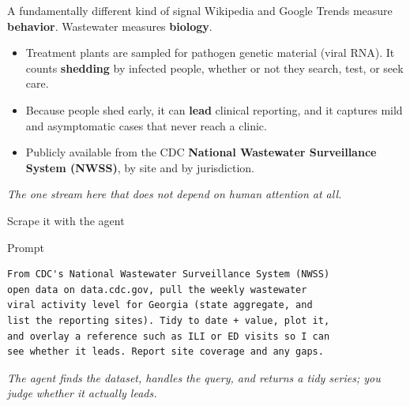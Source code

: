 \documentclass[aspectratio=169,11pt]{beamer}
\begin{document}
\begin{frame}{A fundamentally different kind of signal}
  Wikipedia and Google Trends measure \textbf{behavior}. Wastewater measures \textbf{biology}.
  \begin{itemize}
    \item Treatment plants are sampled for pathogen genetic material (viral RNA). It counts
          \textbf{shedding} by infected people, whether or not they search, test, or seek care.
    \item Because people shed early, it can \textbf{lead} clinical reporting, and it captures
          mild and asymptomatic cases that never reach a clinic.
    \item Publicly available from the CDC \textbf{National Wastewater Surveillance System
          (NWSS)}, by site and by jurisdiction.
  \end{itemize}
  \vspace{0.3em}
  \begin{center}
    \itshape The one stream here that does not depend on human attention at all.
  \end{center}
\end{frame}

\begin{frame}[fragile]{Scrape it with the agent}
  \begin{block}{Prompt}
  \begin{lstlisting}
From CDC's National Wastewater Surveillance System (NWSS)
open data on data.cdc.gov, pull the weekly wastewater
viral activity level for Georgia (state aggregate, and
list the reporting sites). Tidy to date + value, plot it,
and overlay a reference such as ILI or ED visits so I can
see whether it leads. Report site coverage and any gaps.
  \end{lstlisting}
  \end{block}
  \begin{center}
    \itshape The agent finds the dataset, handles the query, and returns a tidy series; you
    judge whether it actually leads.
  \end{center}
\end{frame}
\end{document}
